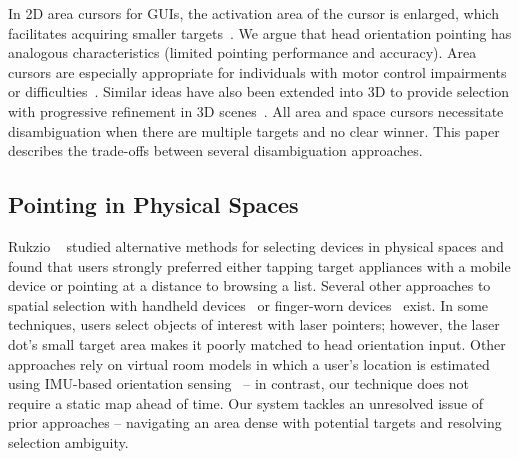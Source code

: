 In 2D area cursors for GUIs, the activation area of the cursor is enlarged, which facilitates acquiring smaller targets~\cite{kabbash1995prince}. We argue that head orientation pointing has analogous characteristics (limited pointing performance and accuracy). Area cursors are especially appropriate for individuals with motor control impairments or difficulties~\cite{worden1997making,findlater2010enhanced}. Similar ideas have also been extended into 3D to provide selection with progressive refinement in 3D scenes~\cite{bacim2013design}. All area and space cursors necessitate disambiguation when there are multiple targets and no clear winner. This paper describes the trade-offs between several disambiguation approaches.



\subsection{Pointing in Physical Spaces}
Rukzio  ~\cite{rukzio_experimental_2006} studied alternative methods for selecting devices in physical spaces and found that users strongly preferred either tapping target appliances with a mobile device or pointing at a distance to browsing a list. Several other approaches to spatial selection with handheld devices~\cite{beigl_point_1999,patel_2-way_2003,wilson_xwand:_2003,schmidt_picontrol:_2012,kemp_point-and-click_2008} or finger-worn devices~\cite{merrill_augmenting_2007} exist.
In some techniques, users select objects of interest with laser pointers; however, the laser dot's small target area makes it poorly matched to head orientation input.
Other approaches rely on virtual room models in which a user's location is estimated using IMU-based orientation sensing~\cite{wilson_xwand:_2003,lifton_tricorder:_2007} -- in contrast, our technique does not require a static map ahead of time.
Our system tackles an unresolved issue of prior approaches -- navigating an area dense with potential targets and resolving selection ambiguity.

